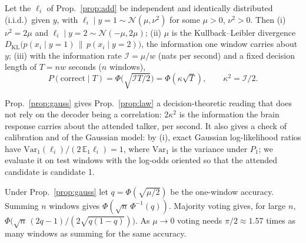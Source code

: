 \begin{proposition}\label{prop:gauss}
Let the $\ell_i$ of Prop.~\ref{prop:add} be independent and identically distributed
(i.i.d.)\ given $y$, with
$\ell_i\mid y{=}1\sim\mathcal N(\mu,\nu^2)$ for some $\mu>0$, $\nu^2>0$. Then (i)
$\nu^2=2\mu$ and $\ell_i\mid y{=}2\sim\mathcal N(-\mu,2\mu)$; (ii) $\mu$ is the
Kullback--Leibler divergence $D_{\mathrm{KL}}\big(p(x_i\mid y{=}1)\,\|\,p(x_i\mid y{=}2)\big)$,
the information one window carries about $y$; (iii) with the information rate $\mathcal I=\mu/w$ (nats
per second) and a fixed decision length of $T=nw$ seconds ($n$ windows),
\[P(\mathrm{correct}\mid T)=\Phi\big(\sqrt{\mathcal I T/2}\big)=\Phi(\kappa\sqrt T),\qquad
\kappa^2=\mathcal I/2 .\]
\end{proposition}
Prop.~\ref{prop:gauss} gives Prop.~\ref{prop:law} a decision-theoretic reading that does not
rely on the decoder being a correlation: $2\kappa^2$ is the information the brain response
carries about the attended talker, per second. It also gives a check of calibration and of
the Gaussian model: by (i), exact Gaussian log-likelihood ratios have
$\mathrm{Var}_1(\ell_i)/(2\,\mathbb E_1\ell_i)=1$, where $\mathrm{Var}_1$ is the variance
under $P_1$; we evaluate it on test windows with the log-odds oriented so that the attended
candidate is candidate 1.

\begin{proposition}\label{prop:vote}
Under Prop.~\ref{prop:gauss} let $q=\Phi(\sqrt{\mu/2})$ be the one-window accuracy. Summing
$n$ windows gives $\Phi(\sqrt n\,\Phi^{-1}(q))$. Majority voting gives, for large $n$,
$\Phi\big(\sqrt n\,(2q-1)/(2\sqrt{q(1-q)})\big)$. As $\mu\to0$ voting needs
$\pi/2\approx1.57$ times as many windows as summing for the same accuracy.
\end{proposition}

